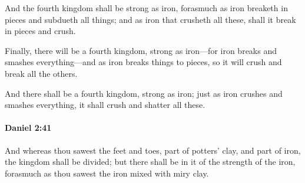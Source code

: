 			\begin{versebox}
					\item[BHS] 
					\item[LXX] 
					\item[ASV] And the fourth kingdom shall be strong as iron, forasmuch as iron breaketh in pieces and subdueth all things; and as iron that crusheth all these, shall it break in pieces and crush.
					\item[NIV] Finally, there will be a fourth kingdom, strong as iron—for iron breaks and smashes everything—and as iron breaks things to pieces, so it will crush and break all the others.
					\item[NRSV] And there shall be a fourth kingdom, strong as iron; just as iron crushes and smashes everything, it shall crush and shatter all these.
			\end{versebox}

		\paragraph{Daniel 2:41} %
			\label{DANIEL-2-41}

			And whereas thou sawest the feet and toes, part of potters’ clay, and part of iron, the kingdom shall be divided; but there shall be in it of the strength of the iron, forasmuch as thou sawest the iron mixed with miry clay.

